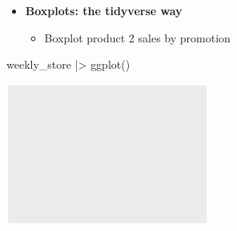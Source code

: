 \documentclass[
  ignorenonframetext,
]{beamer}
\newenvironment{Shaded}{\begin{snugshade}}{\end{snugshade}}
\newcommand{\FunctionTok}[1]{\textcolor[rgb]{0.28,0.35,0.67}{#1}}
\newcommand{\NormalTok}[1]{\textcolor[rgb]{0.00,0.23,0.31}{#1}}
\newcommand{\SpecialCharTok}[1]{\textcolor[rgb]{0.37,0.37,0.37}{#1}}
\providecommand{\tightlist}{%
  \setlength{\itemsep}{0pt}\setlength{\parskip}{0pt}}\usepackage{longtable,booktabs,array}
\begin{document}
\begin{frame}[fragile]{}
\label{section-24}
\begin{itemize}
\item
  \textbf{Boxplots: the tidyverse way}

  \begin{itemize}
  \tightlist
  \item
    Boxplot product 2 sales by promotion
  \end{itemize}
\end{itemize}

\tiny

\begin{Shaded}
\begin{Highlighting}[]
\NormalTok{weekly\_store }\SpecialCharTok{|\textgreater{}} \FunctionTok{ggplot}\NormalTok{()}
\end{Highlighting}
\end{Shaded}

\begin{center}
\includegraphics[width=0.5\textwidth,height=\textheight]{003_describing_data_files/figure-beamer/unnamed-chunk-23-1.pdf}
\end{center}
\end{frame}
\end{document}
